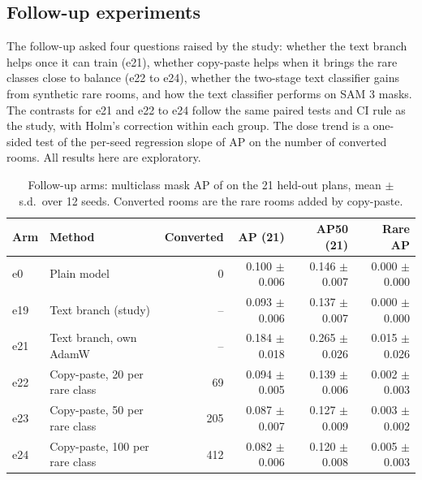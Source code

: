 \subsection{Follow-up experiments}
\label{sec:followup}

The follow-up asked four questions raised by the study: whether the text branch
helps once it can train (e21), whether copy-paste helps when it brings the rare
classes close to balance (e22 to e24), whether the two-stage text classifier
gains from synthetic rare rooms, and how the text classifier performs on SAM 3
masks. The contrasts for e21 and e22 to e24 follow the same paired tests and
CI rule as the study, with Holm's correction within each group. The dose trend
is a one-sided test of the per-seed regression slope of AP on the number of
converted rooms. All results here are exploratory.

\begin{table}[H]
\centering
\caption{Follow-up arms: multiclass mask AP of  on the 21
held-out plans, mean $\pm$ s.d.\ over 12 seeds. Converted rooms are the rare
rooms added by copy-paste.}
\label{tab:followuparms}
\small
\begin{tabular}{@{}llrrrr@{}}
\toprule
Arm & Method & Converted & AP (21) & AP50 (21) & Rare AP \\
\midrule
e0 & Plain model & 0 & 0.100 $\pm$ 0.006 & 0.146 $\pm$ 0.007 & 0.000 $\pm$ 0.000 \\
e19 & Text branch (study) & -- & 0.093 $\pm$ 0.006 & 0.137 $\pm$ 0.007 & 0.000 $\pm$ 0.000 \\
e21 & Text branch, own AdamW & -- & 0.184 $\pm$ 0.018 & 0.265 $\pm$ 0.026 & 0.015 $\pm$ 0.026 \\
e22 & Copy-paste, 20 per rare class & 69 & 0.094 $\pm$ 0.005 & 0.139 $\pm$ 0.006 & 0.002 $\pm$ 0.003 \\
e23 & Copy-paste, 50 per rare class & 205 & 0.087 $\pm$ 0.007 & 0.127 $\pm$ 0.009 & 0.003 $\pm$ 0.002 \\
e24 & Copy-paste, 100 per rare class & 412 & 0.082 $\pm$ 0.006 & 0.120 $\pm$ 0.008 & 0.005 $\pm$ 0.003 \\
\bottomrule
\end{tabular}
\end{table}

